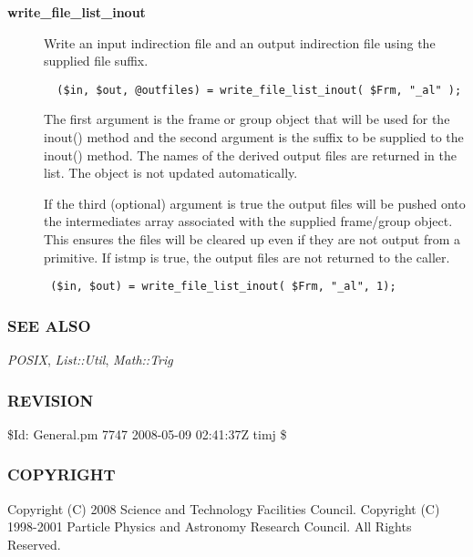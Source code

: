 \begin{description}
\begin{description}
\item[{\textbf{write\_file\_list\_inout}}] \mbox{}

Write an input indirection file and an output indirection file using the
supplied file suffix.

\begin{verbatim}
  ($in, $out, @outfiles) = write_file_list_inout( $Frm, "_al" );
\end{verbatim}


The first argument is the frame or group object that will be used
for the inout() method and the second argument is the suffix to
be supplied to the inout() method. The names of the derived output files
are returned in the list. The object is not updated automatically.



If the third (optional) argument
is true the output files will be pushed onto the intermediates
array associated with the supplied frame/group object. This ensures
the files will be cleared up even if they are not output from a
primitive. If istmp is true, the output files are not returned to
the caller.

\begin{verbatim}
 ($in, $out) = write_file_list_inout( $Frm, "_al", 1);
\end{verbatim}
\end{description}
\subsubsection*{SEE ALSO\label{ORAC::General_SEE_ALSO}}


\emph{POSIX},
\emph{List::Util},
\emph{Math::Trig}

\subsubsection*{REVISION\label{ORAC::General_REVISION}}


\$Id: General.pm 7747 2008-05-09 02:41:37Z timj \$

\subsubsection*{COPYRIGHT\label{ORAC::General_COPYRIGHT}}


Copyright (C) 2008 Science and Technology Facilities Council.
Copyright (C) 1998-2001 Particle Physics and Astronomy Research
Council. All Rights Reserved.


\end{description}
